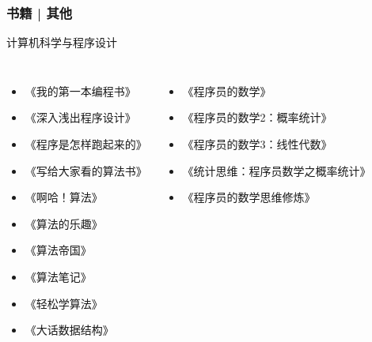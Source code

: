 \begin{frame}
  \frametitle{书籍 | 其他}
  \begin{block}{计算机科学与程序设计}
    \begin{columns}
    \begin{itemize}
      \item 《我的第一本编程书》
      \item 《深入浅出程序设计》
      \item 《程序是怎样跑起来的》
      \item 《写给大家看的算法书》
      \item 《啊哈！算法》
      \item 《算法的乐趣》
      \item 《算法帝国》
      \item 《算法笔记》
      \item 《轻松学算法》
      \item 《大话数据结构》
    \end{itemize}
    \begin{itemize}
      \item 《程序员的数学》
      \item 《程序员的数学2：概率统计》
      \item 《程序员的数学3：线性代数》
      \item 《统计思维：程序员数学之概率统计》
      \item 《程序员的数学思维修炼》
    \end{itemize}
  \end{columns}
  \end{block}
\end{frame}


